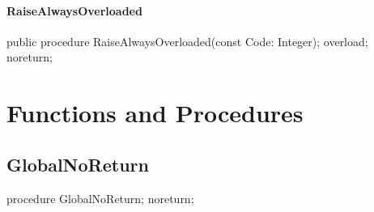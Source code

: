 \documentclass{report}
\newif\ifpdf
\begin{document}
\paragraph*{RaiseAlwaysOverloaded}\hspace*{\fill}

\label{ok_noreturn.TMyClass-RaiseAlwaysOverloaded}
\begin{list}{}{
\setlength{\itemindent}{0cm}
\setlength{\listparindent}{0cm}
\setlength{\leftmargin}{\evensidemargin}
\addtolength{\leftmargin}{\tmplength}
\settowidth{\labelsep}{X}
\addtolength{\leftmargin}{\labelsep}
\setlength{\labelwidth}{\tmplength}
}
\item[\textbf{Declaration}\hfill]
\ifpdf
\begin{flushleft}
\fi
\begin{ttfamily}
public procedure RaiseAlwaysOverloaded(const Code: Integer); overload; noreturn;\end{ttfamily}

\ifpdf
\end{flushleft}
\fi

\end{list}
\section{Functions and Procedures}
\ifpdf
\subsection*{\large{\textbf{GlobalNoReturn}}\normalsize\hspace{1ex}\hrulefill}
\else
\subsection*{GlobalNoReturn}
\fi
\label{ok_noreturn-GlobalNoReturn}
\begin{list}{}{
\setlength{\itemindent}{0cm}
\setlength{\listparindent}{0cm}
\setlength{\leftmargin}{\evensidemargin}
\addtolength{\leftmargin}{\tmplength}
\settowidth{\labelsep}{X}
\addtolength{\leftmargin}{\labelsep}
\setlength{\labelwidth}{\tmplength}
}
\item[\textbf{Declaration}\hfill]
\ifpdf
\begin{flushleft}
\fi
\begin{ttfamily}
procedure GlobalNoReturn; noreturn;\end{ttfamily}

\ifpdf
\end{flushleft}
\fi

\end{list}
\ifpdf
\end{document}
